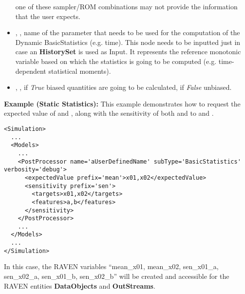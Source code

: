\begin{itemize}
  one of these sampler/ROM combinations may not provide the information that the
  user expects.
  \\
   \item {}, , name of the parameter that needs
   to be used for the computation of the Dynamic BasicStatistics (e.g. time). This node needs to
   be inputted just in case an \textbf{HistorySet} is used as Input. It represents the reference
   monotonic variable based on which the statistics is going to be computed (e.g. time-dependent
   statistical moments).
  \item {}, , if \textit{True} biased
  quantities are going to be calculated, if \textit{False} unbiased.
\end{itemize}
\textbf{Example (Static Statistics):}  This example demonstrates how to request the expected value of
 and , along with the sensitivity of both  and  to
 and .
\begin{lstlisting}[style=XML,morekeywords={name,subType,debug}]
<Simulation>
  ...
  <Models>
    ...
    <PostProcessor name='aUserDefinedName' subType='BasicStatistics' verbosity='debug'>
      <expectedValue prefix='mean'>x01,x02</expectedValue>
      <sensitivity prefix='sen'>
        <targets>x01,x02</targets>
        <features>a,b</features>
      </sensitivity>
    </PostProcessor>
    ...
  </Models>
  ...
</Simulation>
\end{lstlisting}

In this case, the RAVEN variables ``mean\_x01, mean\_x02, sen\_x01\_a, sen\_x02\_a, sen\_x01\_b, sen\_x02\_b''
will be created and accessible for the RAVEN entities \textbf{DataObjects} and \textbf{OutStreams}.

